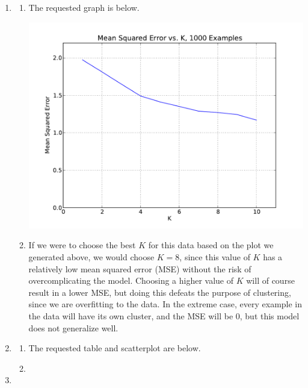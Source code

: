 \documentclass[solution, letterpaper]{cs121}
\begin{document}




\begin{enumerate}
	\item 
		\begin{enumerate}
			\item The requested graph is below.
				\begin{center}
				\includegraphics[scale=0.8]{mse-vs-k.pdf}
				\end{center}
			\item If we were to choose the best $K$ for this data based on the plot we generated above, we would choose $K = 8$, since this value of $K$ has a relatively low mean squared error (MSE) without the risk of overcomplicating the model. Choosing a higher value of $K$ will of course result in a lower MSE, but doing this defeats the purpose of clustering, since we are overfitting to the data. In the extreme case, every example in the data will have its own cluster, and the MSE will be 0, but this model does not generalize well.
		\end{enumerate}
	\item
	\begin{enumerate}
			\item The requested table and scatterplot are below.
				\begin{center}
				
				\end{center}
			\item
		\end{enumerate}
	\item
\end{enumerate}
\end{document}
